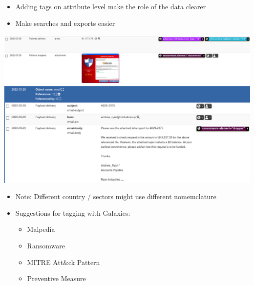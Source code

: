 \begin{frame}
    \begin{itemize}
        \item Adding tags on attribute level make the role of the data clearer
        \item Make searches and exports easier
    \end{itemize}
    \includegraphics[width=1.0\linewidth]{pictures/case2/attribute-tags2.png}
    \includegraphics[width=1.0\linewidth]{pictures/case2/attribute-tags3.png}
\end{frame}

\begin{frame}
    \begin{itemize}
        \item Note: Different country / sectors might use different nomemclature
        \item Suggestions for tagging with Galaxies:
        \begin{itemize}
            \item Malpedia
            \item Ransomware
            \item MITRE Att\&ck Pattern
            \item Preventive Measure
        \end{itemize}
    \end{itemize}
\end{frame}

